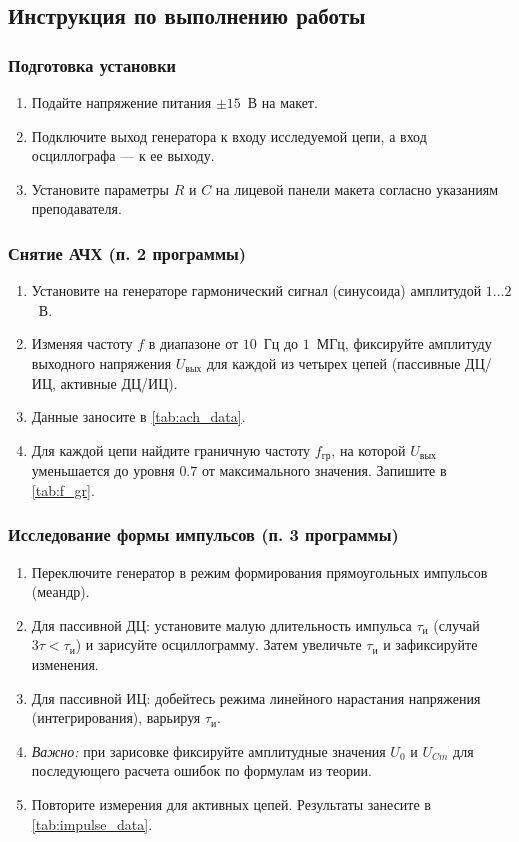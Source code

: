 \subsection*{Инструкция по выполнению работы}

\subsubsection*{Подготовка установки}
\begin{enumerate}
    \item Подайте напряжение питания $\pm 15$~В на макет.
    \item Подключите выход генератора к входу исследуемой цепи, а вход осциллографа --- к ее выходу.
    \item Установите параметры $R$ и $C$ на лицевой панели макета согласно указаниям преподавателя.
\end{enumerate}

\subsubsection*{Снятие АЧХ (п. 2 программы)}
\begin{enumerate}
    \item Установите на генераторе гармонический сигнал (синусоида) амплитудой $1\dots 2$~В.
    \item Изменяя частоту $f$ в диапазоне от $10$~Гц до $1$~МГц, фиксируйте амплитуду выходного напряжения $U_{вых}$ для каждой из четырех цепей (пассивные ДЦ/ИЦ, активные ДЦ/ИЦ).
    \item Данные заносите в \cref{tab:ach_data}.
    \item Для каждой цепи найдите граничную частоту $f_{гр}$, на которой $U_{вых}$ уменьшается до уровня $0.7$ от максимального значения. Запишите в \cref{tab:f_gr}.
\end{enumerate}

\subsubsection*{Исследование формы импульсов (п. 3 программы)}
\begin{enumerate}
    \item Переключите генератор в режим формирования прямоугольных импульсов (меандр).
    \item Для пассивной ДЦ: установите малую длительность импульса $\tau_и$ (случай $3\tau < \tau_и$) и зарисуйте осциллограмму. Затем увеличьте $\tau_и$ и зафиксируйте изменения.
    \item Для пассивной ИЦ: добейтесь режима линейного нарастания напряжения (интегрирования), варьируя $\tau_и$.
    \item \textit{Важно:} при зарисовке фиксируйте амплитудные значения $U_0$ и $U_{Cm}$ для последующего расчета ошибок по формулам из теории.
    \item Повторите измерения для активных цепей. Результаты занесите в \cref{tab:impulse_data}.
\end{enumerate}

